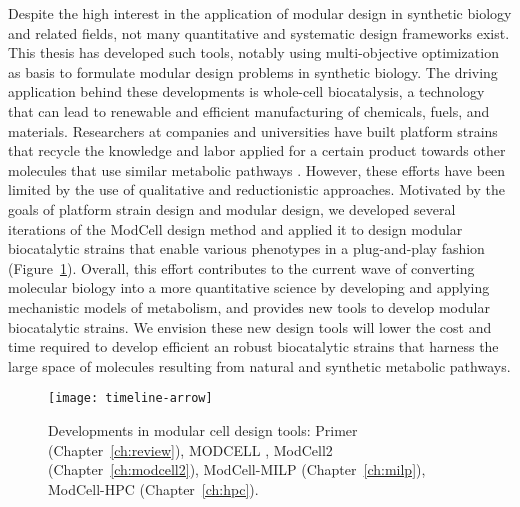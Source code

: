 Despite the high interest in the application of modular design in synthetic biology and related fields,
not many quantitative and systematic design frameworks exist.
This thesis has developed such tools, notably using multi-objective optimization as basis to formulate modular design problems in synthetic biology.
The driving application behind these developments is whole-cell biocatalysis, a technology that can lead to renewable and efficient manufacturing of chemicals, fuels, and materials.
Researchers at companies and universities have built platform strains that recycle the knowledge and labor applied for a certain product towards other molecules that use similar metabolic pathways \citep{nielsen2016}.
However, these efforts have been limited by the use of qualitative and reductionistic approaches.
Motivated by the goals of platform strain design and modular design, we developed several iterations of the ModCell design method and applied it to design modular biocatalytic strains that enable various phenotypes in a plug-and-play fashion (Figure~\ref{fig8:arrow}).
Overall, this effort contributes to the current wave of converting molecular biology into a more quantitative science by developing and applying mechanistic models of metabolism, and provides new tools to develop modular biocatalytic strains.
We envision these new design tools will lower the cost and time required to develop efficient an robust biocatalytic strains that harness the large space of molecules resulting from natural and synthetic metabolic pathways.

\begin{figure}[h]
  \centering
  \texttt{[image: timeline-arrow]}
    \caption{Developments in modular cell design tools: Primer (Chapter~\ref{ch:review}), MODCELL \citep{trinh2015}, ModCell2 (Chapter~\ref{ch:modcell2}), ModCell-MILP (Chapter~\ref{ch:milp}), ModCell-HPC (Chapter~\ref{ch:hpc}).}
    \label{fig8:arrow}
\end{figure}


